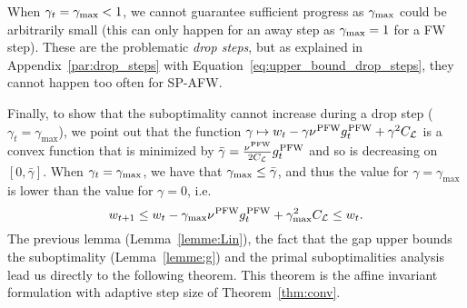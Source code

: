 \documentclass[twoside]{article}
\renewcommand{\L}{\mathcal{L}}
\newcommand{\wt}{w_t}
\newcommand{\wtt}{w_{t+1}}
\newcommand{\gap}{g_{t}}
\newcommand{\CondNumb}{\nu}
\newcommand{\stepsize}{\gamma}
\newcommand{\stepmax}{\stepsize_{\textnormal{\scriptsize max}}} %
\newcommand{\PW}{{\hspace{0.05em}\textnormal{PFW}}}
\newcommand{\0}{\mathbf{0}} %
\begin{document}
    When $\stepsize_t = \stepmax < 1$, we cannot guarantee sufficient progress as $\stepmax$ could be arbitrarily small (this can only happen for an away step as $\stepmax = 1$ for a FW step). These are the problematic \emph{drop steps}, but as explained in Appendix~\ref{par:drop_steps} with Equation~\eqref{eq:upper_bound_drop_steps}, they cannot happen too often for SP-AFW.
    
    Finally, to show that the suboptimality cannot increase during a drop step ($\gamma_t= \gamma_{\max}$), we point out that 
    the function $\gamma \mapsto \wt - \gamma \CondNumb^{\PW}\gap^{\PW}+ \gamma^2 C_\L$ is a convex function that is minimized by $\bar{\gamma} = \frac{\CondNumb^{\PW}}{2C_\L} \gap^{\PW}$ and so is decreasing on $[0, \bar{\stepsize}]$. When $\stepsize_t = \stepmax$, we have that $\stepmax \leq \bar{\gamma}$, and thus the value for $\gamma = \gamma_{\max}$ is lower than the value for $\gamma = 0$, i.e.
      \begin{equation}
            \wtt \leq \wt - \stepmax \CondNumb^{\PW}\gap^{\PW}+ \gamma_{\max}^2 C_\L \leq \wt.
      \end{equation}
  \endproof
    The previous lemma (Lemma~\ref{lemme:Lin}), the fact that the gap upper bounds the suboptimality (Lemma~\ref{lemme:g}) and the primal suboptimalities analysis lead us directly
    to the following theorem. This theorem is the affine invariant formulation with adaptive step size of Theorem~\ref{thm:conv}.
\end{document}
